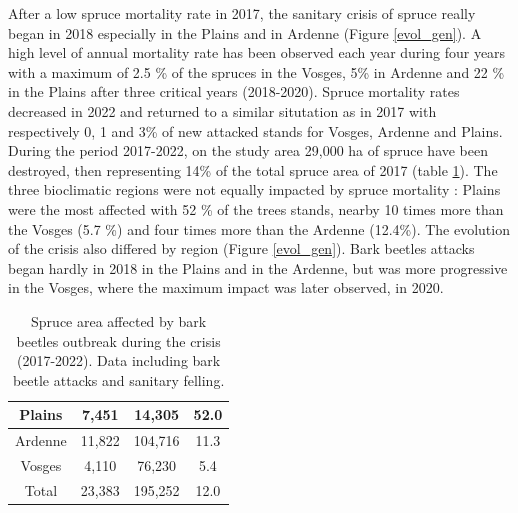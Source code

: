 \documentclass[3p,procedia]{elsarticle}
\def\surfEPVosges{76,230 }
\begin{document}
After a low spruce mortality rate in 2017, the sanitary crisis of spruce really began in 2018 especially in the Plains and in Ardenne (Figure \ref{evol_gen}).
A high level of annual mortality rate  has been observed each year during four years with a maximum of 2.5 \% of the spruces in the Vosges, 5\% in Ardenne and 22 \% in the Plains after three critical years (2018-2020).
Spruce mortality rates decreased in 2022 and returned to a similar situtation as in 2017 with respectively 0, 1 and 3\% of new attacked stands for Vosges, Ardenne and Plains.
During the period 2017-2022, on the study area 29,000 ha of spruce have been destroyed, then representing 14\%  of the total spruce area of 2017 (table \ref{tab_recap}).
The three bioclimatic regions were not equally impacted by spruce mortality : 
Plains were the most affected with 52 \% of the trees stands, nearby 10 times more than the Vosges (5.7 \%) and four times more than the Ardenne (12.4\%).
The evolution of the crisis also differed by region (Figure \ref{evol_gen}).
Bark beetles attacks began hardly in 2018 in the Plains and in the Ardenne, but was more progressive in the Vosges, where the maximum impact was later observed, in 2020.


\begin{table}[htbp]
	\caption{Spruce area affected by bark beetles outbreak during the crisis (2017-2022). Data including bark beetle attacks and sanitary felling.}
	\label{tab_recap}
	\begin{tabular}{|c|c|c|c|}
		\hline

		Plains  & 7,451 & 14,305 & 52.0 \\ \hline
		Ardenne & 11,822 & 104,716                                                                         & 11.3 \\ \hline
		Vosges  & 4,110    &\surfEPVosges                                                                          & 5.4 \\ \hline
		Total   & 23,383 & 195,252 & 12.0 \\ \hline

	\end{tabular}
\end{table}
\end{document}

